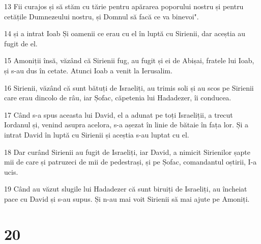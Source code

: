 \par 13 Fii curajos și să stăm cu tărie pentru apărarea poporului nostru și pentru cetățile Dumnezeului nostru, și Domnul să facă ce va binevoi".
\par 14 și a intrat Ioab Și oamenii ce erau cu el în luptă cu Sirienii, dar aceștia au fugit de el.
\par 15 Amoniții însă, văzând că Sirienii fug, au fugit și ei de Abișai, fratele lui Ioab, și s-au dus în cetate. Atunci Ioab a venit la Ierusalim.
\par 16 Sirienii, văzând că sunt bătuți de Israeliți, au trimis soli și au scos pe Sirienii care erau dincolo de râu, iar Șofac, căpetenia lui Hadadezer, îi conducea.
\par 17 Când s-a spus aceasta lui David, el a adunat pe toți Israeliții, a trecut Iordanul și, venind asupra acelora, s-a așezat în linie de bătaie în fața lor. Și a intrat David în luptă cu Sirienii și aceștia s-au luptat cu el.
\par 18 Dar curând Sirienii au fugit de Israeliți, iar David, a nimicit Sirienilor șapte mii de care și patruzeci de mii de pedestrași, și pe Șofac, comandantul oștirii, I-a ucis.
\par 19 Când au văzut slugile lui Hadadezer că sunt biruiți de Israeliți, au încheiat pace cu David și s-au supus. Și n-au mai voit Sirienii să mai ajute pe Amoniți.

\chapter{20}

